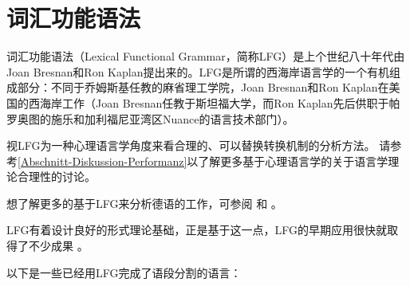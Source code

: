 
\chapter{词汇功能语法}
\label{Kapitel-LFG}

词汇功能语法（Lexical Functional Grammar，简称LFG）是上个世纪八十年代由Joan Bresnan和Ron Kaplan提出来的\citep{BK82a}。LFG是所谓的西海岸语言学的一个有机组成部分：不同于乔姆斯基任教的麻省理工学院，Joan Bresnan和Ron Kaplan在美国的西海岸工作（Joan Bresnan任教于斯坦福大学，而Ron Kaplan先后供职于帕罗奥图的施乐和加利福尼亚湾区Nuance的语言技术部门）。

 \citet{BK82a}视LFG为一种心理语言学角度来看合理的、可以替换转换机制的分析方法。
请参考\ref{Abschnitt-Diskussion-Performanz}以了解更多基于心理语言学的关于语言学理论合理性的讨论。 

想了解更多的基于LFG来分析德语的工作，可参阅 和 。

LFG有着设计良好的形式理论基础\citep{KB82a-u,Kaplan95a}，正是基于这一点，LFG的早期应用很快就取得了不少成果
\citep*{FR83b,FR83a,Yasukawa1984a-u,BH86a-u,%
ED86a-u,%
WA86a-u,%
Delmonte90a-u,%
HHP91a-u,%
Kohl92a-u,KGPRM92a-u,%
KM96a-u,%
Mayo97a-u,Mayo99a-u,%
BS2005b-u,BSagot2005a-u,%
Clement2009a-u,CK2001a-u%
}。

以下是一些已经用LFG完成了语段分割的语言：

